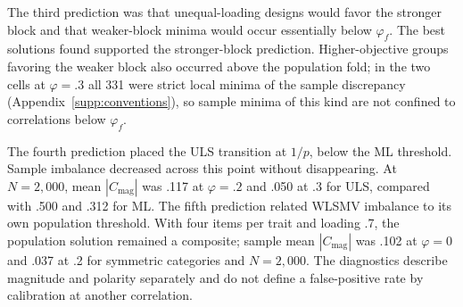 The third prediction was that unequal-loading designs would favor the stronger block and that weaker-block minima would occur essentially below $\varphi_f$. The best solutions found supported the stronger-block prediction. Higher-objective groups favoring the weaker block also occurred above the population fold; in the two cells at $\varphi=.3$ all 331 were strict local minima of the sample discrepancy (Appendix~\ref{supp:conventions}), so sample minima of this kind are not confined to correlations below $\varphi_f$.

The fourth prediction placed the ULS transition at $1/p$, below the ML threshold. Sample imbalance decreased across this point without disappearing. At $N=2{,}000$, mean $|C_{\mathrm{mag}}|$ was .117 at $\varphi=.2$ and .050 at .3 for ULS, compared with .500 and .312 for ML. The fifth prediction related WLSMV imbalance to its own population threshold. With four items per trait and loading .7, the population solution remained a composite; sample mean $|C_{\mathrm{mag}}|$ was .102 at $\varphi=0$ and .037 at .2 for symmetric categories and $N=2{,}000$. The diagnostics describe magnitude and polarity separately and do not define a false-positive rate by calibration at another correlation.
